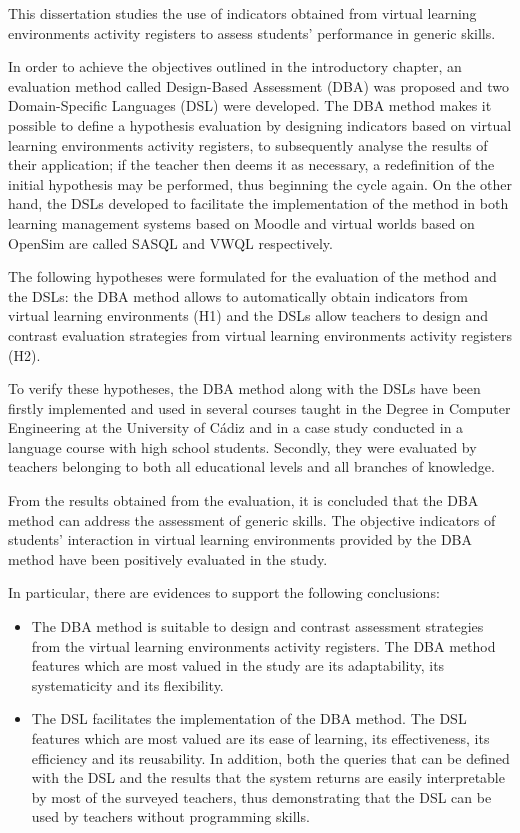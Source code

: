 This dissertation studies the use of indicators obtained from virtual learning environments activity registers to assess students’ performance in generic skills.

In order to achieve the objectives outlined  in the introductory chapter, an evaluation method called Design-Based Assessment (DBA) was proposed and two Domain-Specific Languages (DSL) were developed. The DBA method makes it possible to define a hypothesis evaluation by designing indicators based on virtual learning environments activity registers, to subsequently analyse the results of their application; if the teacher then deems it as necessary, a redefinition of the initial hypothesis may be performed, thus beginning the cycle again. On the other hand, the DSLs developed to facilitate the implementation of the method in both learning management systems based on Moodle and virtual worlds based on OpenSim are called SASQL and VWQL respectively.

The following hypotheses were formulated for the evaluation of the method and the DSLs: the DBA method allows to automatically obtain indicators from virtual learning environments (H1) and the DSLs allow teachers to design and contrast evaluation strategies from virtual learning environments activity registers (H2).

To verify these hypotheses, the DBA method along with the DSLs have been firstly implemented and used in several courses taught in the Degree in Computer Engineering at the University of Cádiz and in a case study conducted in a language course with high school students. Secondly, they were evaluated by teachers belonging to both all educational levels and all branches of knowledge.

From the results obtained from the evaluation, it is concluded that the DBA method can address the assessment of generic skills. The objective indicators of students’ interaction in virtual learning environments provided by the DBA method have been positively evaluated in the study.

In particular, there are evidences to support the following conclusions:

\begin{itemize}
\item The DBA method is suitable to design and contrast assessment strategies from the virtual learning environments activity registers. The DBA method features which are most valued in the study are its adaptability, its systematicity and its flexibility. 
\item The DSL facilitates the implementation of the DBA method. The DSL features which are most valued are its ease of learning, its effectiveness, its efficiency and its reusability. In addition, both the queries that can be defined with the DSL and the results that the system returns are easily interpretable by most of the surveyed teachers, thus demonstrating that the DSL can be used by teachers without programming skills.
\end{itemize}

